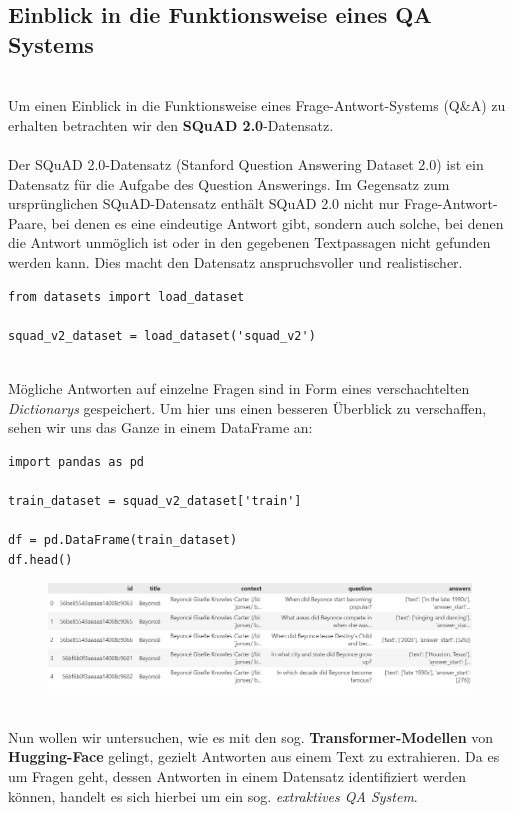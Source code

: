 \documentclass[12pt, a4paper]{article}
\begin{document}
\subsection{Einblick in die Funktionsweise eines QA Systems} \ \\
Um einen Einblick in die Funktionsweise eines Frage-Antwort-Systems (Q\&A) zu erhalten betrachten wir den \textbf{SQuAD 2.0}-Datensatz.
\\  \\
Der SQuAD 2.0-Datensatz (Stanford Question Answering Dataset 2.0) ist ein Datensatz für die Aufgabe des Question Answerings. Im Gegensatz zum ursprünglichen SQuAD-Datensatz enthält SQuAD 2.0 nicht nur Frage-Antwort-Paare, bei denen es eine eindeutige Antwort gibt, sondern auch solche, bei denen die Antwort unmöglich ist oder in den gegebenen Textpassagen nicht gefunden werden kann. Dies macht den Datensatz anspruchsvoller und realistischer.
\\
\begin{lstlisting}[style=mystyle, numbers = none]
from datasets import load_dataset

squad_v2_dataset = load_dataset('squad_v2')
\end{lstlisting}
\ \\
Mögliche Antworten auf einzelne Fragen sind in Form eines verschachtelten \textit{Dictionarys} gespeichert. Um hier uns einen besseren Überblick zu verschaffen, sehen wir uns das Ganze in einem DataFrame an:
\ \\
\begin{lstlisting}[style=mystyle, numbers = none]
import pandas as pd	

train_dataset = squad_v2_dataset['train']

df = pd.DataFrame(train_dataset)
df.head()
\end{lstlisting}
\begin{figure}[h!]
	\centering
	\includegraphics[width=1	\linewidth]{images/dataframe}
\end{figure}
\ \\
Nun wollen wir untersuchen, wie es mit den sog. \textbf{Transformer-Modellen} von \textbf{Hugging-Face} gelingt, gezielt Antworten aus einem Text zu extrahieren. Da es um Fragen geht, dessen Antworten in einem Datensatz identifiziert werden können, handelt es sich hierbei um ein sog. \textit{extraktives QA System}.
\end{document}
